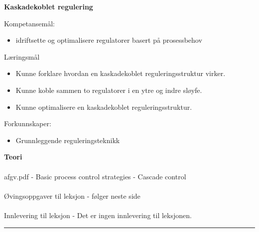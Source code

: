 \centerline{\bf Kaskadekoblet regulering}  \bigskip
Kompetansemål:
\begin{itemize}[noitemsep]
	\item idriftsette og optimalisere regulatorer basert på prosessbehov
\end{itemize}

	Læringsmål
	\begin{itemize}[noitemsep]
		\item Kunne forklare hvordan en kaskadekoblet reguleringsstruktur virker. 
		\item Kunne koble sammen to regulatorer i en ytre og indre sløyfe. 
		\item Kunne optimalisere en kaskadekoblet reguleringsstruktur. 
	\end{itemize}

	Forkunnskaper:


	\begin{itemize}[noitemsep]
		\item Grunnleggende reguleringsteknikk
	\end{itemize}

\textbf{Teori}\\\\
afgv.pdf - Basic process control strategies - Cascade control \\\\
Øvingsoppgaver til leksjon - følger neste side\\\\
Innlevering til leksjon - Det er ingen innlevering til leksjonen. 
\bigskip 
\hrule
\vfil \eject
